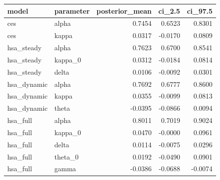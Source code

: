 \begin{tabular}{llrrr}
\toprule
model & parameter & posterior\_mean & ci\_2.5 & ci\_97.5 \\
\midrule
ces & alpha & 0.7454 & 0.6523 & 0.8301 \\
ces & kappa & 0.0317 & -0.0170 & 0.0809 \\
hsa\_steady & alpha & 0.7623 & 0.6700 & 0.8541 \\
hsa\_steady & kappa\_0 & 0.0312 & -0.0184 & 0.0814 \\
hsa\_steady & delta & 0.0106 & -0.0092 & 0.0301 \\
hsa\_dynamic & alpha & 0.7692 & 0.6777 & 0.8600 \\
hsa\_dynamic & kappa & 0.0355 & -0.0099 & 0.0813 \\
hsa\_dynamic & theta & -0.0395 & -0.0866 & 0.0094 \\
hsa\_full & alpha & 0.8011 & 0.7019 & 0.9024 \\
hsa\_full & kappa\_0 & 0.0470 & -0.0000 & 0.0961 \\
hsa\_full & delta & 0.0114 & -0.0075 & 0.0296 \\
hsa\_full & theta\_0 & 0.0192 & -0.0490 & 0.0901 \\
hsa\_full & gamma & -0.0386 & -0.0688 & -0.0074 \\
\bottomrule
\end{tabular}
